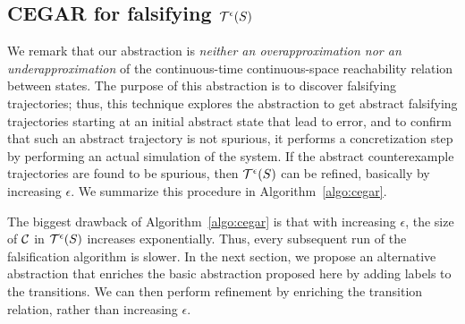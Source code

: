 \subsection{CEGAR for falsifying $\mathcal{T}^{\epsilon}(S)$}

We remark that our abstraction is {\em neither an overapproximation
nor an underapproximation} of the continuous-time continuous-space
reachability relation between states. The purpose of this abstraction
is to discover falsifying trajectories; thus, this technique explores
the abstraction to get abstract falsifying trajectories starting at an
initial abstract state that lead to error, and to confirm that such an
abstract trajectory is not spurious, it performs a concretization step
by performing an actual simulation of the system. If the abstract
counterexample trajectories are found to be spurious, then
$\mathcal{T}^{\epsilon}(S)$ can be refined, basically by
increasing $\epsilon$. We summarize this procedure in
Algorithm~\ref{algo:cegar}.


The biggest drawback of Algorithm~\ref{algo:cegar} is that with
increasing $\epsilon$, the size of $\mathcal{C}$ in
$\mathcal{T}^{\epsilon}(S)$ increases exponentially.  Thus,
every subsequent run of the falsification algorithm is slower. In the
next section, we propose an alternative abstraction that enriches the
basic abstraction proposed here by adding labels to the transitions.
We can then perform refinement by enriching the transition relation,
rather than increasing $\epsilon$.




